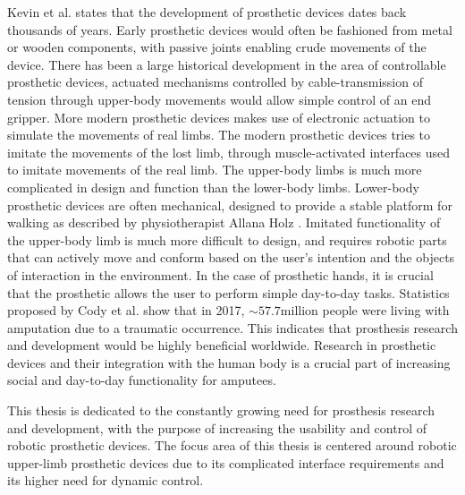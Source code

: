 \documentclass[../main.tex]{subfiles}
\begin{document}
Kevin et al. \cite{Kevin2014} states that the development of prosthetic devices dates back thousands of years.
Early prosthetic devices would often be fashioned from metal or wooden components, with passive joints enabling crude movements of the device. 
There has been a large historical development in the area of controllable prosthetic devices, actuated mechanisms controlled by cable-transmission of tension through upper-body movements would allow simple control of an end gripper.
More modern prosthetic devices makes use of electronic actuation to simulate the movements of real limbs.
The modern prosthetic devices tries to imitate the movements of the lost limb, through muscle-activated interfaces used to imitate movements of the real limb. 
The upper-body limbs is much more complicated in design and function than the lower-body limbs.
Lower-body prosthetic devices are often mechanical, designed to provide a stable platform for walking as described by physiotherapist Allana Holz \cite{mechanicallegs}.
Imitated functionality of the upper-body limb is much more difficult to design, and requires robotic parts that can actively move and conform based on the user's intention and the objects of interaction in the environment.  
In the case of prosthetic hands, it is crucial that the prosthetic allows the user to perform simple day-to-day tasks.
Statistics proposed by Cody et al. \cite{McDonald2020}  show that in 2017, $\sim 57.7 \text{million}$ people were living with amputation due to a \gls{traumatic} occurrence.
This indicates that prosthesis research and development would be highly beneficial worldwide.
Research in prosthetic devices and their integration with the human body is a crucial part of increasing social and day-to-day functionality for amputees.

This thesis is dedicated to the constantly growing need for prosthesis research and development, with the purpose of increasing the usability and control of robotic prosthetic devices.
The focus area of this thesis is centered around robotic upper-limb prosthetic devices due to its complicated interface requirements and its higher need for dynamic control.
\end{document}
